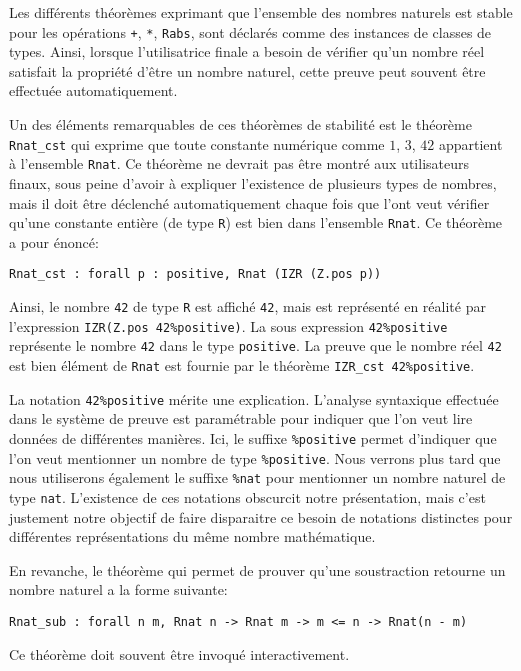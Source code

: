 \documentclass{jflart}
\begin{document}
Les différents théorèmes exprimant que l'ensemble des nombres naturels
est stable pour les opérations \texttt{+}, \texttt{*}, \texttt{Rabs},
sont déclarés comme des instances de classes de types.  Ainsi,
lorsque l'utilisatrice finale a besoin de vérifier qu'un nombre réel
satisfait la propriété d'être un nombre naturel, cette preuve peut souvent
être effectuée automatiquement.

Un des éléments remarquables de ces théorèmes de stabilité est le théorème
\texttt{Rnat\_cst}
qui exprime que toute constante numérique comme \(1\), \(3\), \(42\)
appartient à l'ensemble \texttt{Rnat}.  Ce
théorème ne devrait pas être montré aux utilisateurs finaux, sous peine
d'avoir à expliquer l'existence de plusieurs types de nombres, mais il doit
être déclenché automatiquement chaque fois que l'ont veut vérifier qu'une
constante entière (de type \texttt{R}) est bien dans l'ensemble \texttt{Rnat}.
Ce théorème a pour énoncé:
\begin{verbatim}
Rnat_cst : forall p : positive, Rnat (IZR (Z.pos p))
\end{verbatim}
Ainsi, le nombre \texttt{42} de type \texttt{R} est affiché \texttt{42}, mais
est représenté en réalité par l'expression \texttt{IZR(Z.pos 42\%positive)}.
La sous expression \texttt{42\%positive} représente le nombre \texttt{42} dans
le type \texttt{positive}.
La preuve que le nombre réel \texttt{42} est bien élément de \texttt{Rnat}
est fournie par le théorème \texttt{IZR\_cst 42\%positive}.

La notation \texttt{42\%positive} mérite une explication.  L'analyse
syntaxique effectuée dans le système de preuve est paramétrable pour indiquer
que l'on veut lire données de différentes manières.
Ici, le suffixe \texttt{\%positive} permet d'indiquer que l'on veut
mentionner un nombre de type \texttt{\%positive}.  Nous verrons plus
tard que nous utiliserons également le suffixe \texttt{\%nat} pour
mentionner un nombre naturel de type \texttt{nat}.  L'existence de ces
notations obscurcit notre présentation, mais c'est justement notre
objectif de faire disparaitre ce besoin de notations distinctes pour
différentes représentations du même nombre mathématique.

En revanche, le théorème qui permet de prouver qu'une soustraction retourne un
nombre naturel a la forme suivante:
\begin{verbatim}
Rnat_sub : forall n m, Rnat n -> Rnat m -> m <= n -> Rnat(n - m)
\end{verbatim}
Ce théorème doit souvent être invoqué interactivement.
\end{document}
